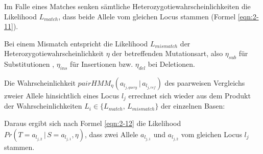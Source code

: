 Im Falle eines Matches senken sämtliche Heterozygotiewahrscheinlichkeiten die Likelihood $L_{match}$, dass beide Allele vom gleichen Locus stammen (Formel \eqref{eqn:2-11}).
\vspace{-0.5cm}
\begin{center}
\end{center}
Bei einem Mismatch entspricht die Likelihood $L_{mismatch}$ der Heterozygotiewahrscheinlichkeit $ \eta $ der betreffenden Mutationsart, also $ \eta_{sub} $ für Substitutionen , $ \eta_{ins} $ für Insertionen bzw. $ \eta_{del} $ bei Deletionen. 
\vspace{-0.5cm}
\begin{center}
\end{center}

Die Wahrscheinlichkeit $ pairHMM_{\eta}(a_{l_{j,query}} \, | \, a_{l_{j,ref}}) $ des  paarweisen Vergleichs zweier Allele hinsichtlich eines Locus $l_{j}$ errechnet sich wieder aus dem Produkt der Wahrscheinlichkeiten $L_{i} \in \{L_{match}, \, L_{mismatch}\}$ der einzelnen Basen:
\vspace{-0.5cm}
\begin{center}
\end{center}

Daraus ergibt sich nach Formel \eqref{eqn:2-12} die Likelihood $ Pr(T=a_{l_{j,2}} \, | \, S=a_{l_{j,1}}, \eta) $, dass zwei Allele $a_{l_{j,1}}$ und $a_{l_{j,2}}$ vom gleichen Locus $l_{j}$ stammen.
\vspace{-0.5cm}
\begin{center}
\end{center}

